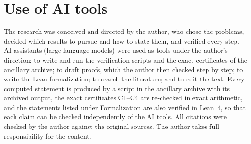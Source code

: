 \documentclass[11pt,a4paper]{article}
\theoremstyle{definition}
\begin{document}
\section*{Use of AI tools}

\noindent The research was conceived and directed by the author, who chose the problems, decided
which results to pursue and how to state them, and verified every step. AI assistants (large
language models) were used as tools under the author's direction: to write and run the
verification scripts and the exact certificates of the ancillary archive; to draft proofs, which
the author then checked step by step; to write the Lean formalization; to search the literature;
and to edit the text. Every computed statement is produced by a script in the ancillary archive
with its archived output, the exact certificates C1--C4 are re-checked in exact arithmetic, and the
statements listed under Formalization are also verified in Lean~4, so that each claim can be
checked independently of the AI tools. All citations were checked by the author against the
original sources. The author takes full responsibility for the content.
\end{document}
